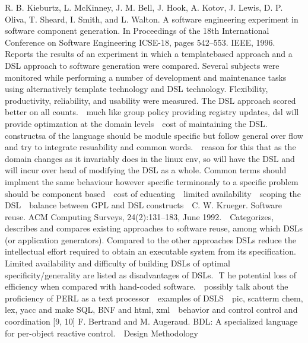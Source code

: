 R. B. Kieburtz, L. McKinney, J. M. Bell, J. Hook,
A. Kotov, J. Lewis, D. P. Oliva, T. Sheard, I. Smith,
and L. Walton. A software engineering experiment in
software component generation. In Proceedings of the
18th International Conference on Software Engineering
ICSE-18, pages 542–553. IEEE, 1996.
Reports the results of an experiment in which a templatebased
approach and a DSL approach to software generation
were compared. Several subjects were monitored
while performing a number of development and maintenance
tasks using alternatively template technology and
DSL technology. Flexibility, productivity, reliability, and
usability were measured. The DSL approach scored better
on all counts.
\newline 
much like group policy providing registry updates, dsl will provide optimzation at the domain levels
\newline 
cost of maintaining the DSL. constructsa of the language should be module specific but follow general over flow and try to integrate resuability and common words.
\newline 
reason for this that as the domain changes as it invariably does in the linux env, so will have the DSL and will incur over head of modifying the DSL as a whole.  Common terms should implment the same behaviour however specific terminonaly to a specific problem should be component based
\newline 
cost of educating 
\newline 
limited availability
\newline 
scoping the DSL
\newline 
balance between GPL and DSL  constructs
\newline 
C. W. Krueger. Software reuse. ACM Computing Surveys,
24(2):131–183, June 1992.
\newline 
Categorizes, describes and compares existing approaches
to software reuse, among which DSLs (or
application generators). Compared to the other approaches
DSLs reduce the intellectual effort required to
obtain an executable system from its specification. Limited
availability and difficulty of building DSLs of optimal
specificity/generality are listed as disadvantages of
DSLs.
\newline T
he potential loss of efficiency when compared with
hand-coded software.
\newline 
possibly talk about the proficiency of PERL as a text processor
\newline 
examples of DSLS
\newline 
pic, scatterm chem, lex, yacc and make 
SQL, BNF and html, xml
\newline 
behavior and control
control and coordination [9, 10]
F. Bertrand and M. Augeraud. BDL: A specialized language
for per-object reactive control.
\newline 
Design Methodology

